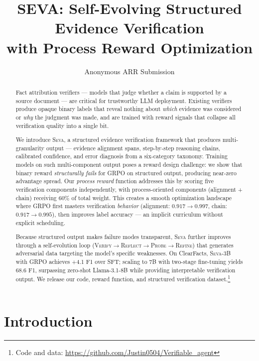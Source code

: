 \documentclass[11pt]{article}
\title{SEVA: Self-Evolving Structured Evidence Verification \\with Process Reward Optimization}
\author{
  Anonymous ARR Submission
}
\newcommand{\seva}{\textsc{Seva}\xspace}
\begin{document}
\maketitle

\begin{abstract}
Fact attribution verifiers --- models that judge whether a claim is supported by a source document --- are critical for trustworthy LLM deployment.
Existing verifiers produce opaque binary labels that reveal nothing about \emph{which} evidence was considered or \emph{why} the judgment was made, and are trained with reward signals that collapse all verification quality into a single bit.

We introduce \seva, a structured evidence verification framework that produces multi-granularity output --- evidence alignment spans, step-by-step reasoning chains, calibrated confidence, and error diagnosis from a six-category taxonomy.
Training models on such multi-component output poses a reward design challenge: we show that binary reward \emph{structurally fails} for GRPO on structured output, producing near-zero advantage spread.
Our \emph{process reward} function addresses this by scoring five verification components independently, with process-oriented components (alignment + chain) receiving 60\% of total weight.
This creates a smooth optimization landscape where GRPO first masters verification \emph{behavior} (alignment: $0.917 \to 0.997$, chain: $0.917 \to 0.995$), then improves label accuracy --- an implicit curriculum without explicit scheduling.

Because structured output makes failure modes transparent, \seva further improves through a self-evolution loop (\textsc{Verify}$\to$\textsc{Reflect}$\to$\textsc{Probe}$\to$\textsc{Refine}) that generates adversarial data targeting the model's specific weaknesses.
On ClearFacts, \seva-3B with GRPO achieves +4.1 F1 over SFT; scaling to 7B with two-stage fine-tuning yields 68.6 F1, surpassing zero-shot Llama-3.1-8B while providing interpretable verification output.
We release our code, reward function, and structured verification dataset.\footnote{Code and data: \url{https://github.com/Justin0504/Verifiable_agent}}
\end{abstract}


\section{Introduction}
\label{sec:intro}
\end{document}
